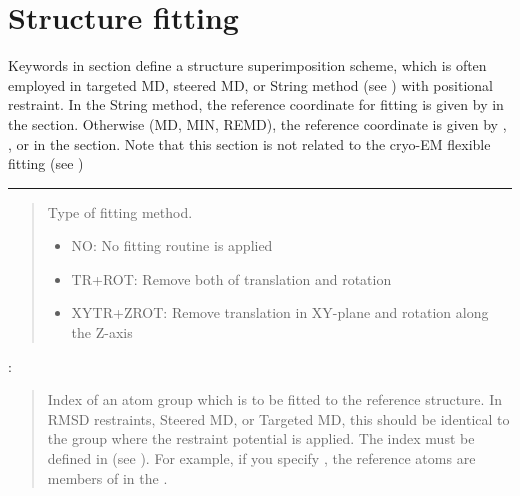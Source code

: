 \documentclass[a4paper,11pt,oneside,english]{sphinxmanual}
\begin{document}
\section{Structure fitting}
\label{\detokenize{13_Fitting:structure-fitting}}
Keywords in \sphinxstylestrong{{[}FITTING{]}} section define a structure superimposition scheme,
which is often employed in targeted MD, steered MD, or String method
(see {\hyperref[\detokenize{15_RPath:rpath}]{}}) with positional restraint.
In the String method, the reference coordinate for fitting is given by 
in the \sphinxstylestrong{{[}INPUT{]}} section. Otherwise (MD, MIN, REMD), the reference coordinate
is given by , , or  in the
\sphinxstylestrong{{[}INPUT{]}} section. Note that this section is not related to
the cryo-EM flexible fitting (see {\hyperref[\detokenize{19_Experiments:experiments}]{}})


\bigskip\hrule\bigskip


 
\begin{quote}


Type of fitting method.
\begin{itemize}
\item {} 
NO: No fitting routine is applied

\item {} 
TR+ROT: Remove both of translation and rotation

\item {} 
XYTR+ZROT: Remove translation in XY-plane and rotation along the Z-axis

\end{itemize}
\end{quote}

: 
\begin{quote}


Index of an atom group which is to be fitted to the reference structure.
In RMSD restraints, Steered MD, or Targeted MD, this should be identical
to the group where the restraint potential is applied.
The index must be defined in \sphinxstylestrong{{[}SELECTION{]}} (see {\hyperref[\detokenize{11_Selection:selection}]{}}).
For example, if you specify , the reference atoms
are members of  in the \sphinxstylestrong{{[}SELECTION{]}}.
\end{quote}
\end{document}
